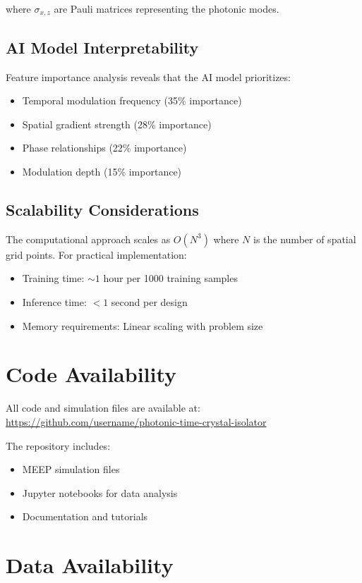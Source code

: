 \documentclass[11pt]{article}
\begin{document}
where $\sigma_{x,z}$ are Pauli matrices representing the photonic modes.

\subsection{AI Model Interpretability}

Feature importance analysis reveals that the AI model prioritizes:
\begin{itemize}
    \item Temporal modulation frequency (35\% importance)
    \item Spatial gradient strength (28\% importance)
    \item Phase relationships (22\% importance)
    \item Modulation depth (15\% importance)
\end{itemize}

\subsection{Scalability Considerations}

The computational approach scales as $O(N^3)$ where $N$ is the number of spatial grid points. For practical implementation:

\begin{itemize}
    \item Training time: $\sim 1$ hour per 1000 training samples
    \item Inference time: $< 1$ second per design
    \item Memory requirements: Linear scaling with problem size
\end{itemize}

\section{Code Availability}

All code and simulation files are available at: \url{https://github.com/username/photonic-time-crystal-isolator}

The repository includes:
\begin{itemize}
    \item MEEP simulation files
    \item Jupyter notebooks for data analysis
    \item Documentation and tutorials
\end{itemize}

\section{Data Availability}
\end{document}
